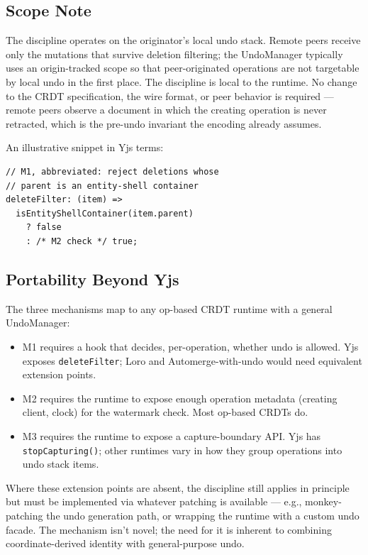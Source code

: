 \subsection{Scope Note}

The discipline operates on the originator's local undo stack. Remote peers receive only the mutations that survive deletion filtering; the UndoManager typically uses an origin-tracked scope so that peer-originated operations are not targetable by local undo in the first place. The discipline is local to the runtime. No change to the CRDT specification, the wire format, or peer behavior is required --- remote peers observe a document in which the creating operation is never retracted, which is the pre-undo invariant the encoding already assumes.

An illustrative snippet in Yjs terms:

\begin{lstlisting}
// M1, abbreviated: reject deletions whose
// parent is an entity-shell container
deleteFilter: (item) =>
  isEntityShellContainer(item.parent)
    ? false
    : /* M2 check */ true;
\end{lstlisting}

\subsection{Portability Beyond Yjs}

The three mechanisms map to any op-based CRDT runtime with a general UndoManager:
\begin{itemize}
    \item M1 requires a hook that decides, per-operation, whether undo is allowed. Yjs exposes \texttt{deleteFilter}; Loro and Automerge-with-undo would need equivalent extension points.
    \item M2 requires the runtime to expose enough operation metadata (creating client, clock) for the watermark check. Most op-based CRDTs do.
    \item M3 requires the runtime to expose a capture-boundary API. Yjs has \texttt{stopCapturing()}; other runtimes vary in how they group operations into undo stack items.
\end{itemize}

Where these extension points are absent, the discipline still applies in principle but must be implemented via whatever patching is available --- e.g., monkey-patching the undo generation path, or wrapping the runtime with a custom undo facade. The mechanism isn't novel; the need for it is inherent to combining coordinate-derived identity with general-purpose undo.





